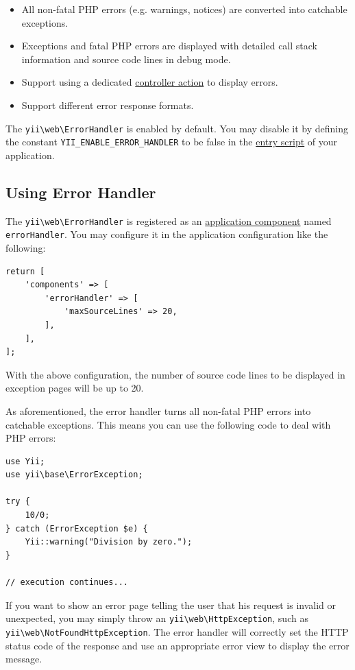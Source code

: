 \begin{itemize}
\item All non-fatal PHP errors (e.g. warnings, notices) are converted into catchable exceptions.
\item Exceptions and fatal PHP errors are displayed with detailed call stack information and source code lines
in debug mode.
\item Support using a dedicated \hyperref[structure-actions.md]{controller action} to display errors.
\item Support different error response formats.
\end{itemize}
The \texttt{yii{\allowbreak{}\textbackslash}web{\allowbreak{}\textbackslash}ErrorHandler} is enabled by default. You may disable it by defining the constant
\lstinline|YII_ENABLE_ERROR_HANDLER| to be false in the \hyperref[structure-entry-scripts.md]{entry script} of your application.

\subsection{Using Error Handler \label{runtime-handling-errors.md::using-error-handler}}
The \texttt{yii{\allowbreak{}\textbackslash}web{\allowbreak{}\textbackslash}ErrorHandler} is registered as an \hyperref[structure-application-components.md]{application component} named \lstinline|errorHandler|.
You may configure it in the application configuration like the following:

\lstset{language=php}\begin{lstlisting}
return [
    'components' => [
        'errorHandler' => [
            'maxSourceLines' => 20,
        ],
    ],
];
\end{lstlisting}
With the above configuration, the number of source code lines to be displayed in exception pages will be up to 20.

As aforementioned, the error handler turns all non-fatal PHP errors into catchable exceptions. This means you can
use the following code to deal with PHP errors:

\lstset{language=php}\begin{lstlisting}
use Yii;
use yii\base\ErrorException;

try {
    10/0;
} catch (ErrorException $e) {
    Yii::warning("Division by zero.");
}

// execution continues...
\end{lstlisting}
If you want to show an error page telling the user that his request is invalid or unexpected, you may simply
throw an \texttt{yii{\allowbreak{}\textbackslash}web{\allowbreak{}\textbackslash}HttpException}, such as \texttt{yii{\allowbreak{}\textbackslash}web{\allowbreak{}\textbackslash}NotFoundHttpException}. The error handler
will correctly set the HTTP status code of the response and use an appropriate error view to display the error
message.

